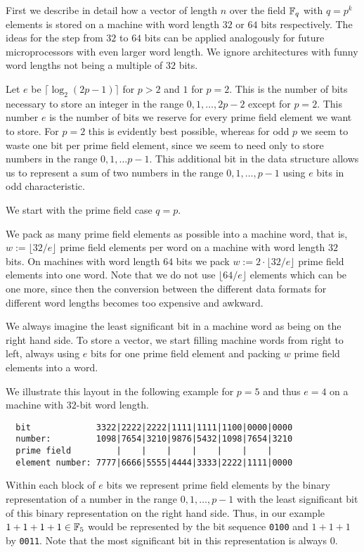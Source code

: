 First we describe in detail how a vector of length $n$ over the field
$\mathbb{F}_q$ with $q=p^k$ elements is stored on a machine with word length $32$ 
or $64$ bits respectively. The ideas for the step from $32$ to $64$ bits
can be applied analogously for future microprocessors with even larger
word length. We ignore architectures with funny word lengths not being
a multiple of $32$ bits.

Let $e$ be $\lceil \log_2(2p-1)\rceil$ for $p > 2$ and $1$ for $p=2$. 
This is the number of bits
necessary to store an integer in the range $0,1, \ldots, 2p-2$ except
for $p=2$. This number $e$ is the number of bits we 
reserve for every prime field element we want to store. For $p=2$ this
is evidently best possible, whereas for odd $p$ we seem to waste
one bit per prime field element, since we seem to need only to store
numbers in the range $0,1,\ldots p-1$. This additional bit in the
data structure allows us to represent a sum of two numbers in the
range $0,1,\ldots, p-1$ using $e$ bits in odd characteristic.

We start with the prime field case $q=p$.

We pack as many prime field elements as possible into a machine
word, that is, $w := \lfloor 32/e \rfloor$ prime field elements per word
on a machine with word length $32$ bits. On machines with word length $64$ bits
we pack $w := 2 \cdot \lfloor 32/e \rfloor$ prime field elements into one word.
Note that we do not use $\lfloor 64/e \rfloor$ elements which can be one
more, since then the conversion between the different data formats for
different word lengths becomes too expensive and awkward.

We always imagine the least significant bit in a machine word as being 
on the right hand side. To store a vector, we start filling machine words 
from right to left, always using $e$ bits for one prime field element and
packing $w$ prime field elements into a word.

We illustrate this layout in the following example for $p=5$ and thus
$e=4$ on a machine with $32$-bit word length.

\begin{verbatim}
  bit             3322|2222|2222|1111|1111|1100|0000|0000
  number:         1098|7654|3210|9876|5432|1098|7654|3210
  prime field         |    |    |    |    |    |    |
  element number: 7777|6666|5555|4444|3333|2222|1111|0000
\end{verbatim}

Within each block of $e$ bits we represent prime field elements
by the binary representation of a number in the range $0,1,\ldots,p-1$
with the least significant bit of this binary representation on the
right hand side. Thus, in our example $1+1+1+1 \in \mathbb{F}_5$ would be
represented by the bit sequence \texttt{0100} and $1+1+1$ by \texttt{0011}.
Note that the most significant bit in this representation is always $0$.

